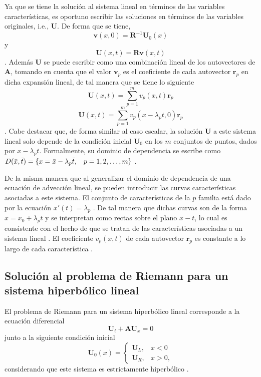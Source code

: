 Ya que se tiene la solución al sistema lineal en términos de las variables características, es oportuno escribir las soluciones en términos de las variables originales, i.e., $\mathbf{U}$. De forma que se tiene,
\begin{equation}
	\mathbf{v}(x,0) = \mathbf{R}^{-1} \mathbf{U}_0(x)
\end{equation}
y
\begin{equation}
	\mathbf{U}(x,t) = \mathbf{R} \mathbf{v}(x,t)
\end{equation}
\cite{Leveque}. Además $\mathbf{U}$ se puede escribir como una combinación lineal de los autovectores de $\mathbf{A}$, tomando en cuenta que el valor $\mathbf{v}_p$ es el coeficiente de cada autovector $\mathbf{r}_p$ en dicha expansión lineal, de tal manera que se tiene lo siguiente
\begin{equation}
	\mathbf{U}(x,t) = \sum_{p=1}^{m} v_p(x,t) \mathbf{r}_p
	\label{eq:sol-linear-sys}
\end{equation}
\begin{equation}
	\mathbf{U}(x,t) = \sum_{p=1}^{m} v_p(x - \lambda_p t, 0) \mathbf{r}_p
	\label{eq:sol-linear-sys-con-caracteristicas}
\end{equation}
\cite{Leveque}. Cabe destacar que, de forma similar al caso escalar, la solución $\mathbf{U}$ a este sistema lineal solo depende de la condición inicial $\mathbf{U}_0$ en los $m$ conjuntos de puntos, dados por $x - \lambda_p t$. Formalmente, su dominio de dependencia se escribe como $D(\bar{x}, \bar{t}) = \{x = \bar{x} - \lambda_{p} \bar{t}, \hspace{3mm} p = 1,2, \dots, m \}$ \cite{Leveque}.

De la misma manera que al generalizar el dominio de dependencia de una ecuación de advección lineal, se pueden introducir las curvas características asociadas a este sistema. El conjunto de características de la $p$ familia está dado por la ecuación $x'(t)=\lambda_{p}$ \cite{Leveque}. De tal manera que dichas curvas son de la forma $x = x_0 + \lambda_{p}t$ y se interpretan como rectas sobre el plano $x-t$, lo cual es consistente con el hecho de que se tratan de las características asociadas a un sistema lineal \cite{Leveque}. El coeficiente $v_p(x,t)$ de cada autovector $\mathbf{r}_p$ es constante a lo largo de cada característica \cite{Leveque}.

\subsection{Solución al problema de Riemann para un sistema hiperbólico lineal}
El problema de Riemann para un sistema hiperbólico lineal corresponde a la ecuación diferencial
\begin{equation}
	\mathbf{U}_t + \mathbf{A}\mathbf{U}_x = 0
\end{equation}
junto a la siguiente condición inicial
\begin{equation}
	\mathbf{U}_{0}(x) = 
	\begin{cases}
		\mathbf{U}_L, & x < 0 \\
		\mathbf{U}_R, & x > 0,
	\end{cases}
\end{equation}
considerando que este sistema es estrictamente hiperbólico \cite{Leveque}.

